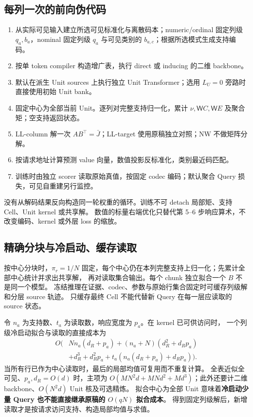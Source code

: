 \documentclass[11pt,UTF8,fontset=fandol]{ctexart}
\numberwithin{equation}{section}
\theoremstyle{definition}
\begin{document}
\subsection{每列一次的前向伪代码}
\begin{enumerate}
\item 从实际可见输入建立所选可见标准化与离散码本；numeric/ordinal 固定列级 $q_a,b_a$，nominal 固定列级 $q_a$ 与可见类别的 $b_{a,c}$；根据所选模式生成支持编码。
\item 按单 token compiler 构造增广表，执行 direct 或 inducing 的二维 backbone。
\item 默认在派生 Unit sources 上执行独立 Unit Transformer；选用 $L_U=0$ 旁路时直接使用初始 Unit bank。
\item 固定中心为全部当前 Unit。逐列对完整支持归一化，累计 $\nu,\mathsf W C,\mathsf W E$ 及聚合矩；空支持返回状态。
\item LL-column 解一次 $AB^\top=\bar J$；LL-target 使用原稿独立对照；NW 不做矩阵分解。
\item 按请求地址计算预测 value 向量，数值投影反标准化，类别最近码匹配。
\item 训练时由独立 scorer 读取原始真值，按固定 codec 编码；默认聚合 Query 损失，可见自重建另行监控。
\end{enumerate}
没有从解码结果反向构造同一轮权重的循环。训练不可 detach 局部矩、支持 Cell、Unit kernel 或共享解。
数值的标量右端优化只替代第 5--6 步响应算术，不改变编码、kernel 或外层 loss 的缩放。

\subsection{精确分块与冷启动、缓存读取}
按中心分块时，$\pi_r=1/N$ 固定，每个中心仍在本列完整支持上归一化；先累计全部中心统计并求出共享解，
再对读取集合输出。每个 chunk 独立拟合一个 $B$ 不是同一个模型。
冻结推理在证据、codec、参数与原始行集合固定时可缓存列级解和分层 source 轨迹。
只缓存最终 Cell 不能代替新 Query 在每一层应读取的 source 状态。

令 $n_a$ 为支持数、$t_a$ 为读取数，响应宽度为 $p_a$。在 kernel 已可供访问时，
一个列级冷启动拟合与读取的直接成本为
\begin{equation}
 \begin{split}
 O\bigl(&Nn_a(d_R+p_a)+(n_a+N)(d_R^2+d_Rp_a)\\
       &+d_R^3+d_R^2p_a+t_a(n_a(d_R+p_a)+d_Rp_a)\bigr).
 \end{split}
 \label{v51:eq:cold-cost}
\end{equation}
当所有行已作为中心读取时，最后的局部均值可复用而不重复计算。
全表近似全可见、$p_a,d_R=O(d)$ 时，主项为
$O(MN^2d+MNd^2+Md^3)$；此外还要计二维 backbone、$O(N^2d)$ Unit 核及可选精炼。
拟合中心为全部 Unit 意味着\textbf{冷启动少量 Query 也不能直接继承原稿的 $O(qN)$ 拟合成本}。
得到固定列级解后，新增读取才是按请求访问支持、构造局部均值与求值。
\end{document}
